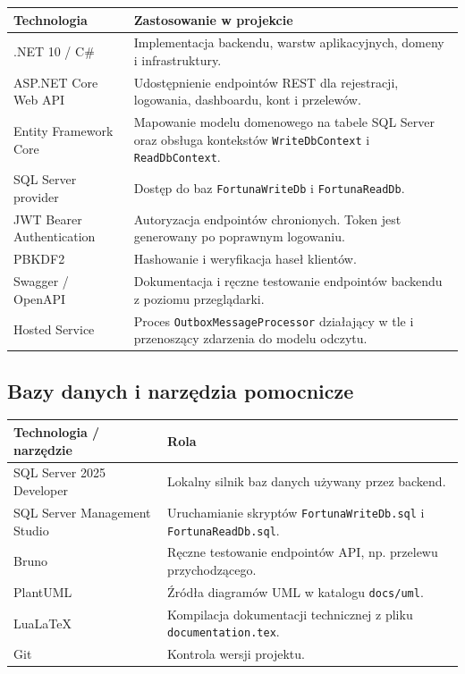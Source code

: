 \documentclass[12pt,a4paper]{article}
\begin{document}
\begin{longtable}{p{}p{}}
\toprule
\textbf{Technologia} & \textbf{Zastosowanie w projekcie} \\
\midrule
\endhead
.NET 10 / C\# & Implementacja backendu, warstw aplikacyjnych, domeny i infrastruktury. \\
ASP.NET Core Web API & Udostępnienie endpointów REST dla rejestracji, logowania, dashboardu, kont i przelewów. \\
Entity Framework Core & Mapowanie modelu domenowego na tabele SQL Server oraz obsługa kontekstów \texttt{WriteDbContext} i \texttt{ReadDbContext}. \\
SQL Server provider & Dostęp do baz \texttt{FortunaWriteDb} i \texttt{FortunaReadDb}. \\
JWT Bearer Authentication & Autoryzacja endpointów chronionych. Token jest generowany po poprawnym logowaniu. \\
PBKDF2 & Hashowanie i weryfikacja haseł klientów. \\
Swagger / OpenAPI & Dokumentacja i ręczne testowanie endpointów backendu z poziomu przeglądarki. \\
Hosted Service & Proces \texttt{OutboxMessageProcessor} działający w tle i przenoszący zdarzenia do modelu odczytu. \\
\bottomrule
\end{longtable}

\subsection{Bazy danych i narzędzia pomocnicze}

\begin{longtable}{p{}p{}}
\toprule
\textbf{Technologia / narzędzie} & \textbf{Rola} \\
\midrule
\endhead
SQL Server 2025 Developer & Lokalny silnik baz danych używany przez backend. \\
SQL Server Management Studio & Uruchamianie skryptów \texttt{FortunaWriteDb.sql} i \texttt{FortunaReadDb.sql}. \\
Bruno & Ręczne testowanie endpointów API, np. przelewu przychodzącego. \\
PlantUML & Źródła diagramów UML w katalogu \texttt{docs/uml}. \\
LuaLaTeX & Kompilacja dokumentacji technicznej z pliku \texttt{documentation.tex}. \\
Git & Kontrola wersji projektu. \\
\bottomrule
\end{longtable}
\end{document}
